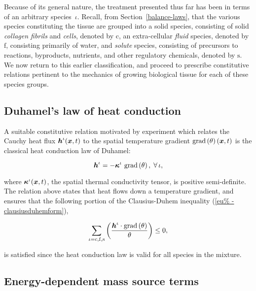 Because of its general nature, the treatment presented thus far has been in
terms of an arbitrary species~$\iota$. Recall, from
Section~\ref{balance-laws}, that the various species constituting the
tissue are grouped into a solid species, consisting of solid
\emph{collagen fibrils} and \emph{cells}, denoted by $\mathrm{c}$, an
extra-cellular \emph{fluid} species, denoted by $\mathrm{f}$,
consisting primarily of water, and \emph{solute} species, consisting
of precursors to reactions, byproducts, nutrients, and other
regulatory chemicals, denoted by $\mathrm{s}$. We now return to this
earlier classification, and proceed to prescribe constitutive
relations pertinent to the mechanics of growing biological tissue for
each of these species groups.

\subsection{Duhamel's law of heat conduction}
\label{eu-duhamel-law}

A suitable constitutive relation motivated by experiment which relates
the Cauchy heat flux $\mbox{\boldmath$ h$}^{\iota}(\mbox{\boldmath$ x$},t)$ to the spatial temperature
gradient $\mathrm{grad}\left(\theta\right)(\mbox{\boldmath$ x$},t)$ is the classical
heat conduction law of Duhamel:

\begin{equation}
\mbox{\boldmath$ h$}^{\iota} =  -
\mbox{\boldmath$\kappa$}^{\iota}\ \mathrm{grad}\left(\theta\right),\;\forall\,\iota,
\label{eu-heat-conduction}
\end{equation}

\noindent where $\mbox{\boldmath$\kappa$}^{\iota}(\mbox{\boldmath$ x$},t)$, the spatial thermal
conductivity tensor, is positive semi-definite. The relation above
states that heat flows down a temperature gradient, and ensures that
the following portion of the Clausius-Duhem inequality (\ref{eu%
  -clausiusduhemform}),

\begin{equation*}
\sum\limits_{\iota=\mathrm{c},\mathrm{f},\mathrm{s}}
\left(\frac{\mbox{\boldmath$ h$}^{\iota} \cdot 
  \mathrm{grad}\left(\theta\right)}{\theta} \right) \leq 0,
\end{equation*}

\noindent is satisfied since the heat conduction law is valid
for all species in the mixture.

\subsection{Energy-dependent mass source terms}
\label{eu-energy-dependent-source}

